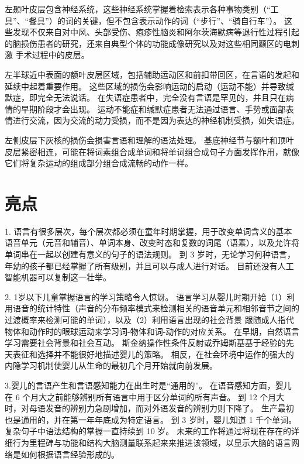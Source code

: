 左颞叶皮层包含神经系统，这些神经系统掌握着检索表示各种事物类别（“工具”、“餐具”）的词的关键，但不包含表示动作的词（“步行”、“骑自行车”）。
这些发现不仅来自对中风、头部受伤、疱疹性脑炎和阿尔茨海默病等退行性过程引起的脑损伤患者的研究，还来自典型个体的功能成像研究以及对这些相同颞区的电刺激 手术过程中的皮层。


左半球近中表面的额叶皮层区域，包括辅助运动区和前扣带回区，在言语的发起和延续中起着重要作用。
这些区域的损伤会影响运动的启动（运动不能）并导致缄默症，即完全无法说话。
在失语症患者中，完全没有言语是罕见的，并且只在病情的早期阶段才会出现。
运动不能症和缄默症患者无法通过语言、手势或面部表情进行交流，因为交流的动力受损，而不是因为表达的神经机制受损，如失语症。


左侧皮层下灰核的损伤会损害言语和理解的语法处理。
基底神经节与额叶和顶叶皮层紧密相连，可能在将词素组合成单词和将单词组合成句子方面发挥作用，就像它们将复杂运动的组成部分组合成流畅的动作一样。



\section{亮点}

1. 语言有很多层次，每个层次都必须在童年时期掌握，用于改变单词含义的基本语音单元（元音和辅音）、单词本身、改变时态和复数的词尾（语素），以及允许将单词串在一起以创建有意义的句子的语法规则。
到 3 岁时，无论学习何种语言，年幼的孩子都已经掌握了所有级别，并且可以与成人进行对话。
目前还没有人工智能机器可以复制这一壮举。 


2. 1岁以下儿童掌握语言的学习策略令人惊讶。
语言学习从婴儿时期开始（1）利用语音的统计特性（声音的分布频率模式来检测相关的语音单元和相邻音节之间的过渡概率来检测可能的单词），以及（2）利用语言出现的社会背景 跟随成人指代物体和动作时的眼球运动来学习词-物体和词-动作的对应关系。
在早期，自然语言学习需要社会背景和社会互动。
斯金纳操作性条件反射或乔姆斯基基于经验的先天表征和选择并不能很好地描述婴儿的策略。
相反，在社会环境中运作的强大的内隐学习机制使婴儿从生命的最初几个月开始就向前发展。


3.婴儿的言语产生和言语感知能力在出生时是“通用的”。
在语音感知方面，婴儿在 6 个月大之前能够辨别所有语言中用于区分单词的所有声音。
到 12 个月大时，对母语发音的辨别力急剧增加，而对外语发音的辨别力则下降了。
生产最初也是通用的，并在第一年年底成为特定语言。
到 3 岁时，婴儿知道 1 千个单词。
复杂句子中语法结构的掌握一直持续到 10 岁。
未来的工作将通过将现在存在的详细行为里程碑与功能和结构大脑测量联系起来来推进该领域，以显示大脑的语言网络是如何根据语言经验形成的。 



